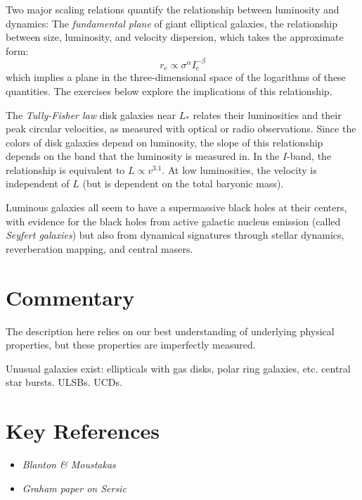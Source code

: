 Two major scaling relations quantify the relationship between
luminosity and dynamics: The {\it fundamental plane} of giant
elliptical galaxies, the relationship between size, luminosity, and
velocity dispersion, which takes the approximate form:
\begin{equation}
r_e \propto \sigma^\alpha I_e^{-\beta}
\end{equation}
which implies a plane in the three-dimensional space of the logarithms
of these quantities. The exercises below explore the implications of
this relationship.

The {\it Tully-Fisher law} disk galaxies near $L_\ast$ relates their
luminosities and their peak circular velocities, as measured with
optical or radio observations. Since the colors of disk galaxies
depend on luminosity, the slope of this relationship depends on the
band that the luminosity is measured in. In the $I$-band, the
relationship is equivalent to $L\propto v^{3.1}$. At low luminosities,
the velocity is independent of $L$ (but is dependent on the total
baryonic mass). 

Luminous galaxies all seem to have a supermassive black holes at their
centers, with evidence for the black holes from active galactic
nucleus emission (called {\it Seyfert galaxies}) but also from
dynamical signatures through stellar dynamics, reverberation mapping,
and central masers.


\section{Commentary}

The description here relies on our best understanding of underlying
physical properties, but these properties are imperfectly measured.

Unusual galaxies exist: ellipticals with gas disks, polar ring
galaxies, etc. central star bursts. ULSBs. UCDs.

\section{Key References}

\begin{itemize}
  \item
    {\it Blanton \& Moustakas}
  \item
    {\it Graham paper on Sersic}
\end{itemize}

\citet{gunn06a}

